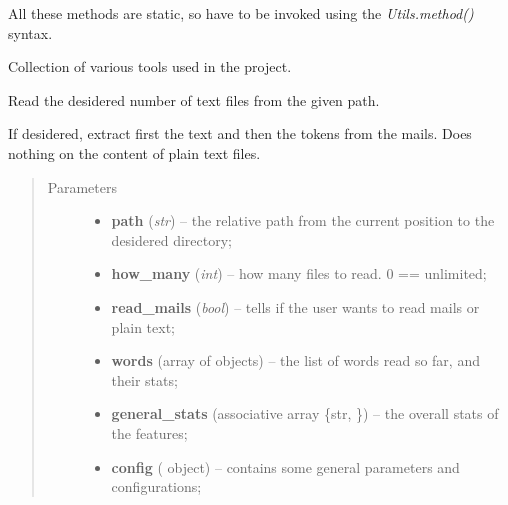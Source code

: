 \documentclass[letterpaper,10pt,english]{sphinxmanual}
\begin{document}
All these methods are static, so have to be invoked using the
\emph{Utils.method()} syntax.
\label{index:module-utils}

\begin{fulllineitems}
\label{index:utils.Utils}
Collection of various tools used in the project.

\begin{fulllineitems}
\label{index:utils.Utils._read_files}
Read the desidered number of text files from the given path.

If desidered, extract first the text and then the tokens
from the mails. Does nothing on the content of plain text files.
\begin{quote}\begin{description}
\item[{Parameters}] \leavevmode\begin{itemize}
\item {} 
\textbf{path} (\emph{str}) -- the relative path from the current position           to the desidered directory;

\item {} 
\textbf{how\_many} (\emph{int}) -- how many files to read. 0 == unlimited;

\item {} 
\textbf{read\_mails} (\emph{bool}) -- tells if the user wants to read mails or plain text;

\item {} 
\textbf{words} (array of {\hyperref[index:gen_stat.Word]{}} objects) -- the list of words read so far, and their stats;

\item {} 
\textbf{general\_stats} (associative array \{str, {\hyperref[index:gen_stat.Stat]{}}\}) -- the overall stats of the features;

\item {} 
\textbf{config} ({\hyperref[index:config.Config]{}} object) -- contains some general parameters and configurations;

\end{itemize}


\end{description}
\end{quote}
\end{fulllineitems}
\end{fulllineitems}
\end{document}
